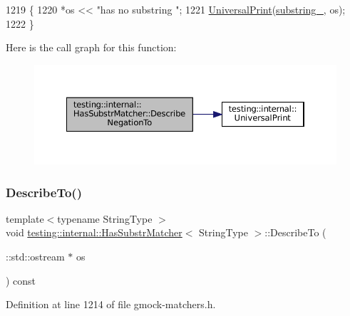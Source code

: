 \begin{DoxyCode}
1219                                                 \{
1220     *os << \textcolor{stringliteral}{"has no substring "};
1221     \hyperlink{namespacetesting_1_1internal_a30708fa2bacf11895b03bdb21eb72309}{UniversalPrint}(\hyperlink{classtesting_1_1internal_1_1HasSubstrMatcher_ac15185527d4f52eda4574c8b845a52f3}{substring\_}, os);
1222   \}
\end{DoxyCode}
Here is the call graph for this function\+:
\nopagebreak
\begin{figure}[H]
\begin{center}
\leavevmode
\includegraphics[width=350pt]{classtesting_1_1internal_1_1HasSubstrMatcher_aa79638f9d3a0c2eb67bc76432f35be1f_cgraph}
\end{center}
\end{figure}
\mbox{\label{classtesting_1_1internal_1_1HasSubstrMatcher_a278f177d2cbdfed29f6755ee0739a521}} 
\subsubsection{\texorpdfstring{Describe\+To()}{DescribeTo()}}
{\footnotesize\ttfamily template$<$typename String\+Type $>$ \\
void \hyperlink{classtesting_1_1internal_1_1HasSubstrMatcher}{testing\+::internal\+::\+Has\+Substr\+Matcher}$<$ String\+Type $>$\+::Describe\+To (\begin{DoxyParamCaption}\item[{\+::std\+::ostream $\ast$}]{os }\end{DoxyParamCaption}) const\hspace{0.3cm}{\ttfamily [inline]}}



Definition at line 1214 of file gmock-\/matchers.\+h.



